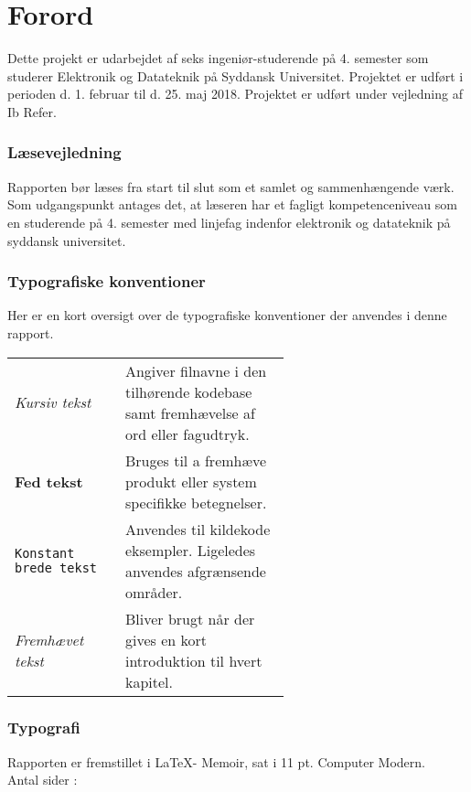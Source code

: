 \chapter*{Forord}\label{chap:forord}
Dette projekt er udarbejdet af seks ingeniør-studerende på 4. semester som studerer Elektronik og Datateknik på Syddansk Universitet. 
Projektet er udført i perioden d. 1. februar til d. 25. maj 2018. 
Projektet er udført under vejledning af Ib Refer.

\subsection{Læsevejledning}
Rapporten bør læses fra start til slut som et samlet og sammenhængende værk. 
Som udgangspunkt antages det, at læseren har et fagligt kompetenceniveau som en studerende på 4. semester med linjefag indenfor elektronik og datateknik på syddansk universitet.

\subsection{Typografiske konventioner}
Her er en kort oversigt over de typografiske konventioner der anvendes i denne rapport.

\bigskip

\begin{tabular}{l p{0.6\linewidth}}
	\textit{Kursiv tekst}			& Angiver filnavne i den tilhørende kodebase samt fremhævelse af ord eller fagudtryk. \\
	\textbf{Fed tekst}				& Bruges til a fremhæve produkt eller system specifikke betegnelser.\\
	\texttt{Konstant brede tekst}	& Anvendes til kildekode eksempler. Ligeledes anvendes afgrænsende områder.\\
	\emph{Fremhævet tekst}		    & Bliver brugt når der gives en kort introduktion til hvert kapitel.\\
\end{tabular}

\subsection{Typografi}
Rapporten er fremstillet i \LaTeX - Memoir, sat i 11 pt. Computer Modern.\\
Antal sider : \pageref{LastPage}